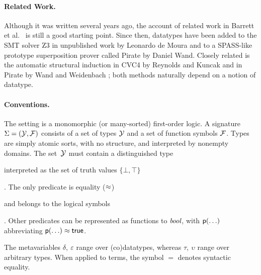 

\paragraph{Related Work.}
Although it was written several years ago, the account of related work in
Barrett et al.\ \cite{barrett-et-al-2007} is still a good starting point.
Since then, datatypes have been added to the SMT solver
Z3 in unpublished work by Leonardo de Moura and to a SPASS-like prototype
superposition prover called Pirate by Daniel Wand.
Closely related is the automatic structural
induction in CVC4 by Reynolds and Kuncak \cite{reynolds-kuncak-2015} and in
Pirate by Wand and Weidenbach \cite{wand-weidenbach-201x};
both methods naturally depend on a notion of datatype.

%

\paragraph{Conventions.}
The setting is a monomorphic (or many-sorted) first-order logic.
A signature $\mathrm{\Sigma} = (\mathcal{Y}, \mathcal{F})$ consists of a set of types $\mathcal{Y}$ and a
set of function symbols $\mathcal{F}$. Types are simply atomic sorts, with no
structure, and interpreted by nonempty domains. The set~$\mathcal{Y}$ must contain a
distinguished type \begin{report} interpreted as the set of truth
values $\{\bot, \top\}$\end{report}. %
The only predicate is equality ($\approx$)\begin{report} and belongs to the logical symbols\end{report}.
Other predicates can be represented as functions to $\textit{bool}$,
with $\textsf{p}(\ldots)$ abbreviating $\textsf{p}(\ldots) \approx \textsf{true}$.
\begin{report}
The metavariables $\delta,\:\varepsilon$ range over (co)datatypes,
whereas $\tau,\:\upsilon$ range over arbitrary types.
When applied to terms, the symbol $=$ denotes syntactic equality.\end{report}

